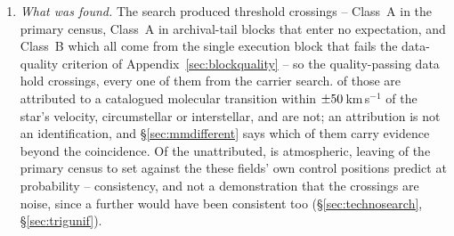\begin{enumerate}[leftmargin=1.6em,itemsep=4pt,topsep=4pt,parsep=0pt]
\item \emph{What was found.} The search produced \EvNCrossRaw{} threshold
crossings -- \CkNCrossCenA{} Class~A in the primary census,
\CeNTailCrossWord{} Class~A in archival-tail blocks that enter no
expectation, and \PrFlagXrossWord{} Class~B which all come from the single
execution block that fails the data-quality criterion of
Appendix~\ref{sec:blockquality} -- so the quality-passing data hold
\EvNCrossQp{} crossings, every one of them from the carrier search.
\EvNAttrQp{} of those are attributed to a catalogued molecular transition
within $\pm50$\,km\,s$^{-1}$ of the star's velocity, circumstellar
or interstellar, and \EvNUnattrQp{} are not; an attribution is not an
identification, and \S\ref{sec:mmdifferent} says which of them carry evidence
beyond the coincidence. Of the unattributed, \CeTlObsCutWord{} is
atmospheric, leaving \CeObs{} of the primary census to set against the
\CeExp{} these fields' own control positions predict at
probability \CeProbNull{} -- consistency, and not a demonstration that the
crossings are noise, since a further \CeAddLim{} would have been consistent
too (\S\ref{sec:technosearch}, \S\ref{sec:trigunif}).


\end{enumerate}
